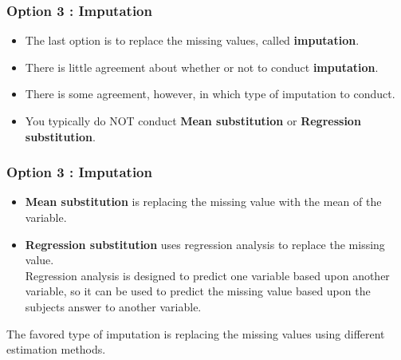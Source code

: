 \documentclass[MASTER.tex]{subfiles}
\begin{document}
	\begin{frame}
		\frametitle{Option 3 : Imputation}
		\Large
				\begin{itemize}
\item The last option is to replace the missing values, called \textbf{imputation}. 
\item There is little agreement about whether or not to conduct \textbf{imputation}. 
\item There is some agreement, however, in which type of imputation to conduct.  
\item You typically do NOT conduct \textbf{Mean substitution} or \textbf{Regression substitution}.
		\end{itemize}

	\end{frame}
	\begin{frame}
		\frametitle{Option 3 : Imputation}
		\Large
		\begin{itemize}
			\item \textbf{Mean substitution} is replacing the missing value with the mean of the variable.
			\item \textbf{Regression substitution} uses regression analysis to replace the missing value.\\  Regression analysis is designed to predict one variable based upon another variable, so it can be used to predict the missing value based upon the subjects answer to another variable.
			
		\end{itemize}
		
		The favored type of imputation is replacing the missing values using different estimation methods. %
		
	\end{frame}
	

	
	
	
	
	
\end{document}
